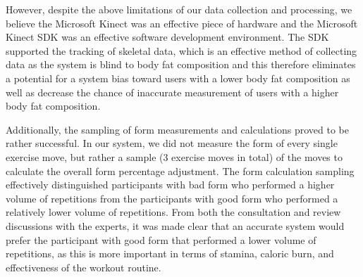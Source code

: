 However, despite the above limitations of our data collection and processing, we believe the Microsoft Kinect was an effective piece of hardware and the Microsoft Kinect SDK was an effective software development environment.  The SDK supported the tracking of skeletal data, which is an effective method of collecting data as the system is blind to body fat composition and this therefore eliminates a potential for a system bias toward users with a lower body fat composition as well as decrease the chance of inaccurate measurement of users with a higher body fat composition.

Additionally, the sampling of form measurements and calculations proved to be rather successful.  In our system, we did not measure the form of every single exercise move, but rather a sample (3 exercise moves in total) of the moves to calculate the overall form percentage adjustment.  The form calculation sampling effectively distinguished participants with bad form who performed a higher volume of repetitions from the participants with good form who performed a relatively lower volume of repetitions.  From both the consultation and review discussions with the experts, it was made clear that an accurate system would prefer the participant with good form that performed a lower volume of repetitions, as this is more important in terms of stamina, caloric burn, and effectiveness of the workout routine.